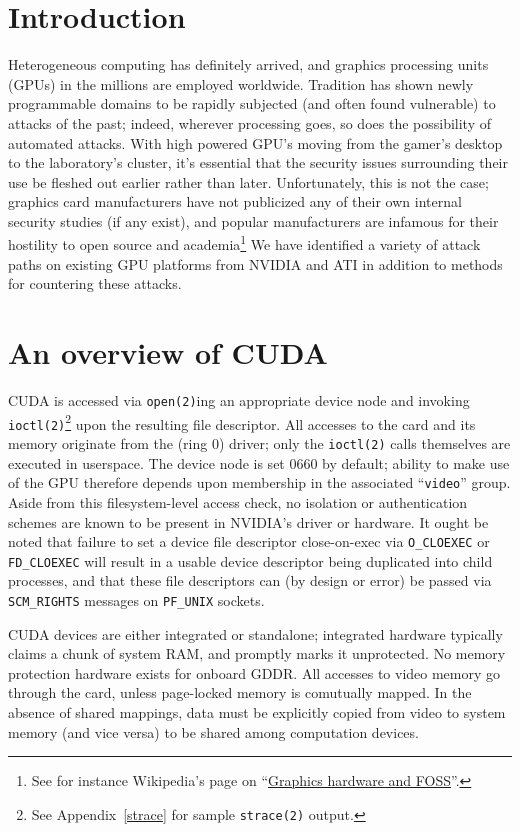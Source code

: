 \documentclass[letterpaper,10pt]{article}
\begin{document}
\begin{multicols}{2}
\section{Introduction}
Heterogeneous computing has definitely arrived, and graphics processing units (GPUs) in the millions are employed worldwide. Tradition has shown newly programmable domains to be rapidly subjected (and often found vulnerable) to attacks of the past; indeed, wherever processing goes, so does the possibility of automated attacks. With high powered GPU's moving from the gamer's desktop to the laboratory's cluster, it's essential that the security issues surrounding their use be fleshed out earlier rather than later. Unfortunately, this is not the case; graphics card manufacturers have not publicized any of their own internal security studies (if any exist), and popular manufacturers are infamous for their
hostility to open source and academia\footnote{See for instance Wikipedia's page on
``\href{http://en.wikipedia.org/wiki/NVIDIA\_and\_FOSS}{Graphics hardware and FOSS}''.}
We have identified a variety of attack paths on existing GPU platforms from NVIDIA and ATI in addition to methods for countering these attacks.

\section{An overview of CUDA}
CUDA is accessed via \texttt{open(2)}ing an appropriate device node and
invoking \texttt{ioctl(2)}\footnote{See Appendix~\ref{strace} for sample \texttt{strace(2)}
output.} upon the resulting file descriptor. All accesses to the card and its memory
originate from the (ring 0) driver; only the \texttt{ioctl(2)} calls themselves
are executed in userspace. The device node is set 0660 by default;
ability to make use of the GPU therefore depends upon membership in the
associated ``\texttt{video}'' group. Aside from this filesystem-level access check, no
isolation or authentication schemes are known to be present in NVIDIA's driver
or hardware. It ought be noted that failure to set a device file descriptor
close-on-exec via \texttt{O\_CLOEXEC} or \texttt{FD\_CLOEXEC} will
result in a usable device descriptor being duplicated into child processes,
and that these file descriptors can (by design or error) be passed via
\texttt{SCM\_RIGHTS} messages on \texttt{PF\_UNIX} sockets.

CUDA devices are either integrated or standalone; integrated hardware typically
claims a chunk of system RAM, and promptly marks it unprotected. No memory
protection hardware exists for onboard GDDR\@. All accesses to video memory go
through the card, unless page-locked memory is comutually mapped. In the
absence of shared mappings, data must be explicitly copied from video to system
memory (and vice versa) to be shared among computation devices\cite{cudaguide}.


\end{multicols}
\end{document}
